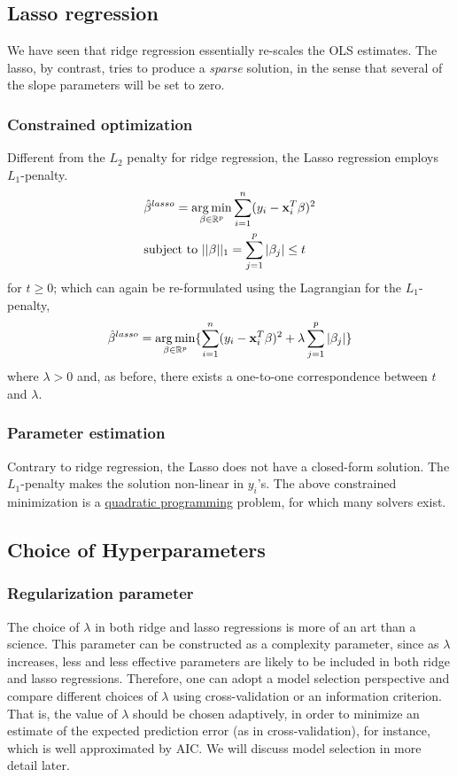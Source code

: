 \subsection*{Lasso regression}
We have seen that ridge regression essentially re-scales the OLS estimates.
The lasso, by contrast, tries to produce a {\it sparse} solution, in the sense that several of the slope parameters will be set to zero.

\subsubsection*{Constrained optimization}
Different from the $L_2$ penalty for ridge regression, the Lasso regression employs $L_1$-penalty.
$$
\begin{aligned}
	&\hat{\beta}^{lasso} = \operatorname*{arg\,min}\limits_{\beta \in \mathbb{R}^p} \sum\limits_{i = 1}^n(y_i - \mathbf{x}_i^T \beta)^2\\
	&\mbox{subject to } ||\beta||_1 = \sum\limits_{j = 1}^p |\beta_j| \le t \\
\end{aligned}
$$
for $t \ge 0$; which can again be re-formulated using the Lagrangian for the $L_1$-penalty,
$$
\hat{\beta}^{lasso} =\operatorname*{arg\,min}\limits_{\beta \in \mathbb{R}^p} \{  \sum\limits_{i = 1}^n(y_i - \mathbf{x}_i^T \beta)^2 + \lambda \sum\limits_{j = 1}^p |\beta_j|\}
$$
where $\lambda > 0$ and, as before, there exists a one-to-one correspondence between $t$ and $\lambda$.

\subsubsection*{Parameter estimation}
Contrary to ridge regression, the Lasso does not have a closed-form solution.
The $L_1$-penalty makes the solution non-linear in $y_i$'s.
The above constrained minimization is a \underline{quadratic programming} problem, for which many solvers exist.

\subsection*{Choice of Hyperparameters}
\subsubsection*{Regularization parameter}

The choice of $\lambda$ in both ridge and lasso regressions is more of an art than a science.
This parameter can be constructed as a complexity parameter, since as $\lambda$ increases, less and less effective parameters are likely to be included in both ridge and lasso regressions.
Therefore, one can adopt a model selection perspective and compare different choices of $\lambda$ using cross-validation or an information criterion.
That is, the value of $\lambda$ should be chosen adaptively, in order to minimize an estimate of the expected prediction error (as in cross-validation), for instance,
which is well approximated by AIC.
We will discuss model selection in more detail later.

